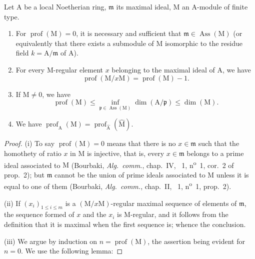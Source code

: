 \begin{proposition}[16.4.6]
\label{0.16.4.6}
Let $\mathrm{A}$ be a local Noetherian ring, $\mathfrak{m}$ its maximal ideal, $\mathrm{M}$ an $\mathrm{A}$-module of finite type.
\begin{enumerate}
  \item[\rm{(i)}]\label{0.16.4.6.i} For $\operatorname{prof}(\mathrm{M})=0$, it is necessary and sufficient that $\mathfrak{m}\in\operatorname{Ass}(\mathrm{M})$ (or equivalently that there exists a submodule of $\mathrm{M}$ isomorphic to the residue field $k=\mathrm{A}/\mathfrak{m}$ of $\mathrm{A}$).
  \item[\rm{(ii)}] For every $\mathrm{M}$-regular element $x$ belonging to the maximal ideal of $\mathrm{A}$, we have
  \begin{equation}
  \label{0.16.4.6.1}
  \tag{16.4.6.1}
    \operatorname{prof}(\mathrm{M}/x\mathrm{M})=\operatorname{prof}(\mathrm{M})-1.
  \end{equation}
  \item[\rm{(iii)}] If $\mathrm{M}\neq 0$, we have
  \begin{equation}
  \label{0.16.4.6.2}
  \tag{16.4.6.2}
    \operatorname{prof}(\mathrm{M})\leq\inf_{\mathfrak{p}\in\operatorname{Ass}(\mathrm{M})}\dim(\mathrm{A}/\mathfrak{p})\leq\dim(\mathrm{M}).
  \end{equation}
  \item[\rm{(iv)}] We have $\operatorname{prof}_\mathrm{A}(\mathrm{M})=\operatorname{prof}_{\widehat{\mathrm{A}}}(\widehat{\mathrm{M}})$.
\end{enumerate}
\end{proposition}

\begin{proof}
(i) To say $\operatorname{prof}(\mathrm{M})=0$ means that there is no $x\in\mathfrak{m}$ such that the homothety of ratio $x$ in $\mathrm{M}$ is injective, that is, every $x\in\mathfrak{m}$ belongs to a prime ideal associated to $\mathrm{M}$ (Bourbaki, \emph{Alg.~comm.}, chap.~IV, \textsection~1, n\textsuperscript{o}~1, cor.~2 of prop.~2); but $\mathfrak{m}$ cannot be the union of prime ideals associated to $\mathrm{M}$ unless it is equal to one of them (Bourbaki, \emph{Alg.~comm.}, chap.~II, \textsection~1, n\textsuperscript{o}~1, prop.~2).

(ii) If $(x_i)_{1\leq i\leq m}$ is a $(\mathrm{M}/x\mathrm{M})$-regular maximal sequence of elements of $\mathfrak{m}$, the sequence formed of $x$ and the $x_i$ is $\mathrm{M}$-regular, and it follows from the definition that it is maximal when the first sequence is; whence the conclusion.

(iii) We argue by induction on $n=\operatorname{prof}(\mathrm{M})$, the assertion being evident for $n=0$.
We use the following lemma:
\end{proof}

